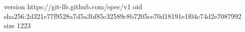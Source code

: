 version https://git-lfs.github.com/spec/v1
oid sha256:2d321e77f9528a7d5a3bf85c32589c8b7205ce70d18191e1f04c74d2e7087992
size 1223
